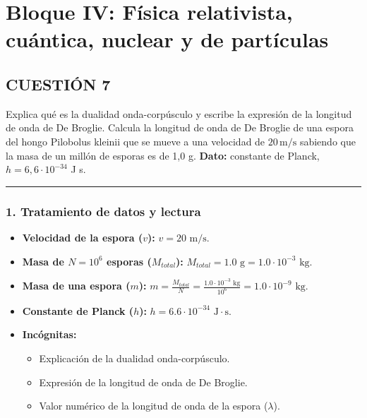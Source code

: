 \newpage
\section{Bloque IV: Física relativista, cuántica, nuclear y de partículas}
\label{sec:fismod_2024_jun_ord}

\subsection{CUESTIÓN 7}
\label{subsec:C7_2024_jun_ord}

\begin{cajaenunciado}
Explica qué es la dualidad onda-corpúsculo y escribe la expresión de la longitud de onda de De Broglie. Calcula la longitud de onda de De Broglie de una espora del hongo Pilobolus kleinii que se mueve a una velocidad de $20\,\text{m/s}$ sabiendo que la masa de un millón de esporas es de 1,0 g.
\textbf{Dato:} constante de Planck, $h=6,6\cdot10^{-34}$ J s.
\end{cajaenunciado}
\hrule

\subsubsection*{1. Tratamiento de datos y lectura}
\begin{itemize}
    \item \textbf{Velocidad de la espora ($v$):} $v = 20 \text{ m/s}$.
    \item \textbf{Masa de $N=10^6$ esporas ($M_{total}$):} $M_{total} = 1.0 \text{ g} = 1.0 \cdot 10^{-3} \text{ kg}$.
    \item \textbf{Masa de una espora ($m$):} $m = \frac{M_{total}}{N} = \frac{1.0 \cdot 10^{-3} \text{ kg}}{10^6} = 1.0 \cdot 10^{-9} \text{ kg}$.
    \item \textbf{Constante de Planck ($h$):} $h = 6.6 \cdot 10^{-34} \text{ J}\cdot\text{s}$.
    \item \textbf{Incógnitas:}
    \begin{itemize}
        \item Explicación de la dualidad onda-corpúsculo.
        \item Expresión de la longitud de onda de De Broglie.
        \item Valor numérico de la longitud de onda de la espora ($\lambda$).
    \end{itemize}
\end{itemize}

